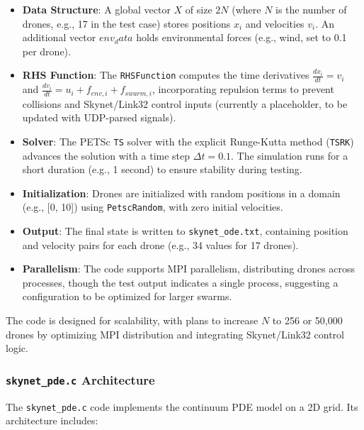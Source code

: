 \documentclass{article}
\theoremstyle{plain}
\begin{document}
\begin{itemize}
    \item \textbf{Data Structure}: A global vector $X$ of size $2N$ (where $N$ is the number of drones, e.g., 17 in the test case) stores positions $x_i$ and velocities $v_i$. An additional vector $env_data$ holds environmental forces (e.g., wind, set to 0.1 per drone).
    \item \textbf{RHS Function}: The \texttt{RHSFunction} computes the time derivatives $\frac{d x_i}{dt} = v_i$ and $\frac{d v_i}{dt} = u_i + f_{env,i} + f_{swarm,i}$, incorporating repulsion terms to prevent collisions and Skynet/Link32 control inputs (currently a placeholder, to be updated with UDP-parsed signals).
    \item \textbf{Solver}: The PETSc \texttt{TS} solver with the explicit Runge-Kutta method (\texttt{TSRK}) advances the solution with a time step $\Delta t = 0.1$. The simulation runs for a short duration (e.g., 1 second) to ensure stability during testing.
    \item \textbf{Initialization}: Drones are initialized with random positions in a domain (e.g., [0, 10]) using \texttt{PetscRandom}, with zero initial velocities.
    \item \textbf{Output}: The final state is written to \texttt{skynet\_ode.txt}, containing position and velocity pairs for each drone (e.g., 34 values for 17 drones).
    \item \textbf{Parallelism}: The code supports MPI parallelism, distributing drones across processes, though the test output indicates a single process, suggesting a configuration to be optimized for larger swarms.
\end{itemize}

The code is designed for scalability, with plans to increase $N$ to 256
or 50,000 drones by optimizing MPI distribution and integrating Skynet/Link32 control logic.

\subsubsection{\texttt{skynet\_pde.c} Architecture}
The \texttt{skynet\_pde.c} code implements the continuum PDE model on a 2D grid. Its architecture includes:
\end{document}
